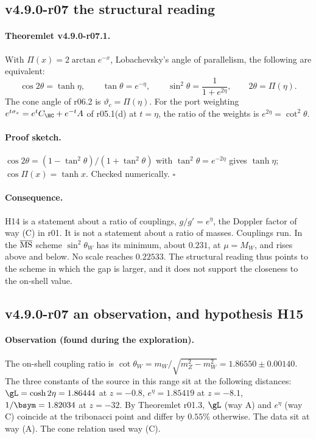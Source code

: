 \subsection*{v4.9.0-r07 the structural reading}
\label{subsec:v490-r07-structure}

\paragraph{Theoremlet v4.9.0-r07.1.}
With \(\Pi(x)=2\arctan e^{-x}\), Lobachevsky's angle of parallelism, the following are equivalent:
\[
\cos2\theta=\tanh\eta,\qquad \tan\theta=e^{-\eta},\qquad \sin^2\theta=\frac1{1+e^{2\eta}},\qquad 2\theta=\Pi(\eta).
\]
The cone angle of r06.2 is \(\vartheta_c=\Pi(\eta)\).  For the port weighting \(e^{t\sigma_x}=e^tC_{\HC}+e^{-t}A\) of
r05.1(d) at \(t=\eta\), the ratio of the weights is \(e^{2\eta}=\cot^2\theta\).

\paragraph{Proof sketch.}
\(\cos2\theta=(1-\tan^2\theta)/(1+\tan^2\theta)\) with \(\tan^2\theta=e^{-2\eta}\) gives \(\tanh\eta\);
\(\cos\Pi(x)=\tanh x\).  Checked numerically.  \(\square\)

\paragraph{Consequence.}
H14 is a statement about a ratio of couplings, \(g/g'=e^{\eta}\), the Doppler factor of way (C) in r01.  It is not a
statement about a ratio of masses.  Couplings run.  In the \(\overline{\rm MS}\) scheme \(\sin^2\theta_W\) has its minimum,
about \(0.231\), at \(\mu=M_W\), and rises above and below.  No scale reaches \(0.22533\).  The structural reading thus
points to the scheme in which the gap is larger, and it does not support the closeness to the on-shell value.

\subsection*{v4.9.0-r07 an observation, and hypothesis H15}
\label{subsec:v490-r07-h15}

\paragraph{Observation (found during the exploration).}
The on-shell coupling ratio is \(\cot\theta_W=m_W/\sqrt{m_Z^2-m_W^2}=1.86550\pm0.00140\).  The three constants of the
source in this range sit at the following distances: \(\gL=\cosh2\eta=1.86444\) at \(z=-0.8\), \(e^{\eta}=1.85419\) at
\(z=-8.1\), \(1/\bsym=1.82034\) at \(z=-32\).  By Theoremlet r01.3, \(\gL\) (way A) and \(e^\eta\) (way C) coincide at the
tribonacci point and differ by \(0.55\%\) otherwise.  The data sit at way (A).  The cone relation used way (C).

